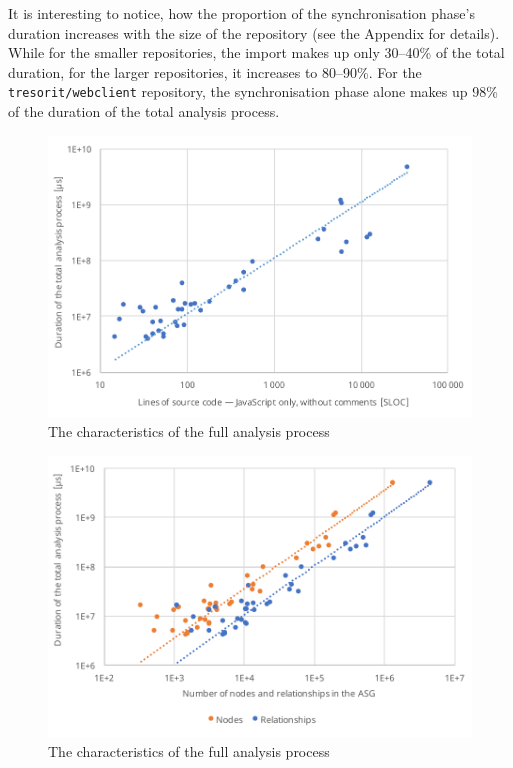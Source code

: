 It is interesting to notice, how the proportion of the synchronisation phase's duration increases with the size of the repository (see the Appendix for details). While for the smaller repositories, the import makes up only 30–40\% of the total duration, for the larger repositories, it increases to 80–90\%. For the \lstinline{tresorit/webclient} repository, the synchronisation phase alone makes up 98\% of the duration of the total analysis process.

\begin{figure}[!p]
	\centerfloat
	\includegraphics[width=\textwidth-1cm,clip]{figures/measurement-totaltime-sloc.pdf}
	\caption{The characteristics of the full analysis process}
	\label{fig:measurement-totaltime-sloc}
\end{figure}

\begin{figure}[!p]
	\centerfloat
	\includegraphics[width=\textwidth-1cm,clip]{figures/measurement-totaltime-nodes-relationships.pdf}
	\caption{The characteristics of the full analysis process}
	\label{fig:measurement-totaltime-nodes-relationships}
\end{figure}



